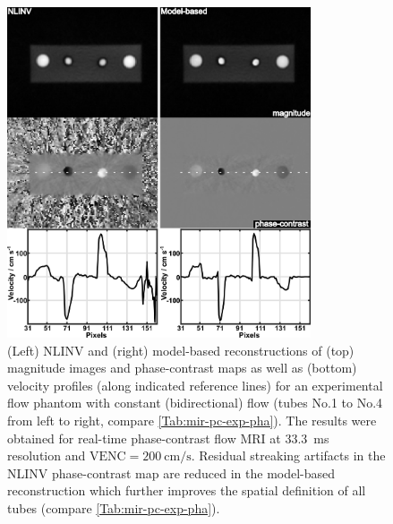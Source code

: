 \begin{figure}[tb]
  \centering
  \includegraphics[width=0.8\textwidth]{fig/mir-pc-exp-pha.png}
  \caption{(Left) NLINV and (right) model-based reconstructions of (top) magnitude images and phase-contrast maps as well as (bottom) velocity profiles (along indicated reference lines) for an experimental flow phantom with constant (bidirectional) flow (tubes No.1 to No.4 from left to right, compare \cref{Tab:mir-pc-exp-pha}). The results were obtained for real-time phase-contrast flow MRI at \SI{33.3}{\ms} resolution and $\text{VENC} = \SI{200}{\cm\per\second}$. Residual streaking artifacts in the NLINV phase-contrast map are reduced in the model-based reconstruction which further improves the spatial definition of all tubes (compare \cref{Tab:mir-pc-exp-pha}).} \label{Fig:mir-pc-exp-pha}
\end{figure}

